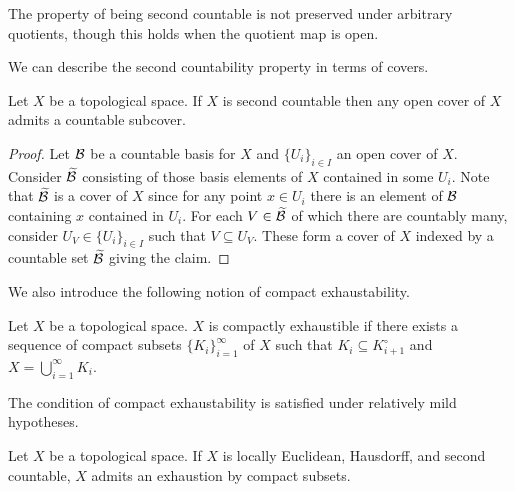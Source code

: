 \begin{remark}
    The property of being second countable is not preserved under arbitrary quotients, though this holds when the quotient map is open. 
\end{remark}
We can describe the second countability property in terms of covers. 
\begin{proposition}\label{prop: second countability via covers}
    Let $X$ be a topological space. If $X$ is second countable then any open cover of $X$ admits a countable subcover. 
\end{proposition}
\begin{proof}
    Let $\mathcal{B}$ be a countable basis for $X$ and $\{U_{i}\}_{i\in I}$ an open cover of $X$. Consider $\widetilde{\mathcal{B}}$ consisting of those basis elements of $X$ contained in some $U_{i}$. Note that $\widetilde{\mathcal{B}}$ is a cover of $X$ since for any point $x\in U_{i}$ there is an element of $\mathcal{B}$ containing $x$ contained in $U_{i}$. For each $V\in\widetilde{\mathcal{B}}$ of which there are countably many, consider $U_{V}\in\{U_{i}\}_{i\in I}$ such that $V\subseteq U_{V}$. These form a cover of $X$ indexed by a countable set $\widetilde{\mathcal{B}}$ giving the claim. 
\end{proof}
We also introduce the following notion of compact exhaustability. 
\begin{definition}\label{def: compact exhaustability}
    Let $X$ be a topological space. $X$ is compactly exhaustible if there exists a sequence of compact subsets $\{K_{i}\}_{i=1}^{\infty}$ of $X$ such that $K_{i}\subseteq K_{i+1}^{\circ}$ and $X=\bigcup_{i=1}^{\infty}K_{i}$.
\end{definition}
The condition of compact exhaustability is satisfied under relatively mild hypotheses. 
\begin{proposition}\label{prop: locally euclidean, Hausdorff, second countable implies compactly exhaustible}
    Let $X$ be a topological space. If $X$ is locally Euclidean, Hausdorff, and second countable, $X$ admits an exhaustion by compact subsets. 
\end{proposition}
